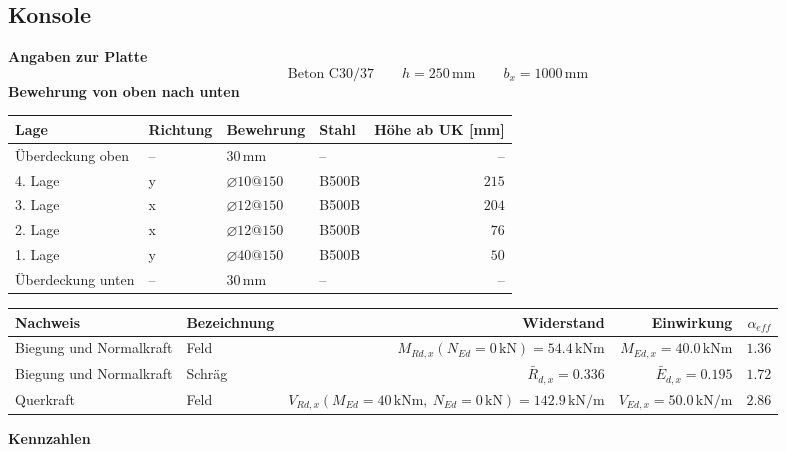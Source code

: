 \documentclass[11pt,a4paper]{article}
\begin{document}
\subsection{Konsole}
\noindent\textbf{Angaben zur Platte}
\begin{equation*}
\text{Beton C30/37} \qquad h = 250\,\mathrm{mm} \qquad b_x = 1000\,\mathrm{mm}
\end{equation*}
\noindent\textbf{Bewehrung von oben nach unten}
\begin{longtable}{llllr}
\hline
Lage & Richtung & Bewehrung & Stahl & Höhe ab UK [mm] \\
\hline
\endhead
Überdeckung oben & – & $30\,\mathrm{mm}$ & – & – \\
4. Lage & y & $\varnothing 10@150$ & B500B & $215$ \\
3. Lage & x & $\varnothing 12@150$ & B500B & $204$ \\
2. Lage & x & $\varnothing 12@150$ & B500B & $76$ \\
1. Lage & y & $\varnothing 40@150$ & B500B & $50$ \\
Überdeckung unten & – & $30\,\mathrm{mm}$ & – & – \\
\hline
\end{longtable}
\begin{xltabular}{\linewidth}{>{\raggedright\arraybackslash}X>{\raggedright\arraybackslash}Xrrr}
\hline
Nachweis & Bezeichnung & Widerstand & Einwirkung & $\alpha_{eff}$ \\
\hline
\endhead
Biegung und Normalkraft & Feld & $M_{Rd,x}(N_{Ed} = 0\,\mathrm{kN}) = 54.4\,\mathrm{kNm}$ & $M_{Ed,x} = 40.0\,\mathrm{kNm}$ & $1.36$ \\
Biegung und Normalkraft & Schräg & $\bar{R}_{d,x} = 0.336$ & $\bar{E}_{d,x} = 0.195$ & $1.72$ \\
Querkraft & Feld & $V_{Rd,x}(M_{Ed} = 40\,\mathrm{kNm},\ N_{Ed} = 0\,\mathrm{kN}) = 142.9\,\mathrm{kN}/\mathrm{m}$ & $V_{Ed,x} = 50.0\,\mathrm{kN}/\mathrm{m}$ & $2.86$ \\
\hline
\end{xltabular}
\noindent\textbf{Kennzahlen}
\end{document}

